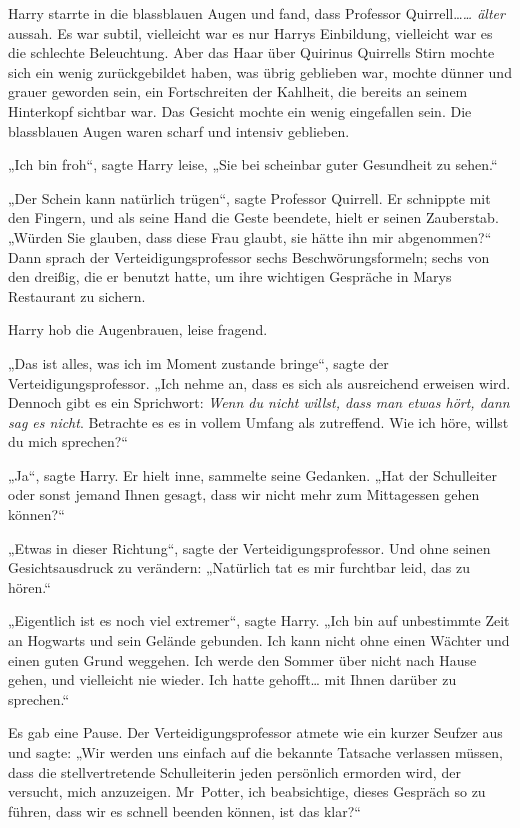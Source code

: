 {Harry starrte in die blassblauen Augen und fand, dass Professor Quirrell…\emph{… älter} aussah. Es war subtil, vielleicht war es nur Harrys Einbildung, vielleicht war es die schlechte Beleuchtung. Aber das Haar über Quirinus Quirrells Stirn mochte sich ein wenig zurückgebildet haben, was übrig geblieben war, mochte dünner und grauer geworden sein, ein Fortschreiten der Kahlheit, die bereits an seinem Hinterkopf sichtbar war. Das Gesicht mochte ein wenig eingefallen sein. Die blassblauen Augen waren scharf und intensiv geblieben.

„Ich bin froh“, sagte Harry leise, „Sie bei scheinbar guter Gesundheit zu sehen.“

„Der Schein kann natürlich trügen“, sagte Professor Quirrell. Er schnippte mit den Fingern, und als seine Hand die Geste beendete, hielt er seinen Zauberstab. „Würden Sie glauben, dass diese Frau glaubt, sie hätte ihn mir abgenommen?“ Dann sprach der Verteidigungsprofessor sechs Beschwörungsformeln; sechs von den dreißig, die er benutzt hatte, um ihre wichtigen Gespräche in Marys Restaurant zu sichern.

Harry hob die Augenbrauen, leise fragend.

„Das ist alles, was ich im Moment zustande bringe“, sagte der Verteidigungsprofessor. „Ich nehme an, dass es sich als ausreichend erweisen wird. Dennoch gibt es ein Sprichwort: \emph{Wenn du nicht willst, dass man etwas hört, dann sag es nicht}. Betrachte es es in vollem Umfang als zutreffend. Wie ich höre, willst du mich sprechen?“

„Ja“, sagte Harry. Er hielt inne, sammelte seine Gedanken. „Hat der Schulleiter oder sonst jemand Ihnen gesagt, dass wir nicht mehr zum Mittagessen gehen können?“

„Etwas in dieser Richtung“, sagte der Verteidigungsprofessor. Und ohne seinen Gesichtsausdruck zu verändern: „Natürlich tat es mir furchtbar leid, das zu hören.“

„Eigentlich ist es noch viel extremer“, sagte Harry. „Ich bin auf unbestimmte Zeit an Hogwarts und sein Gelände gebunden. Ich kann nicht ohne einen Wächter und einen guten Grund weggehen. Ich werde den Sommer über nicht nach Hause gehen, und vielleicht nie wieder. Ich hatte gehofft… mit Ihnen darüber zu sprechen.“

Es gab eine Pause. Der Verteidigungsprofessor atmete wie ein kurzer Seufzer aus und sagte: „Wir werden uns einfach auf die bekannte Tatsache verlassen müssen, dass die stellvertretende Schulleiterin jeden persönlich ermorden wird, der versucht, mich anzuzeigen. Mr~Potter, ich beabsichtige, dieses Gespräch so zu führen, dass wir es schnell beenden können, ist das klar?“

}
